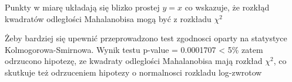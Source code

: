 \documentclass[a4paper,11pt]{article}
\def\\{\hfill\break}
\begin{document}
Punkty w miarę układają się blizko prostej $y = x$ co wskazuje, że rozkłąd kwadratów odległości Mahalanobisa mogą być z rozkładu $ \chi^2$

\\

Żeby bardziej się upewnić przeprowadzono test zgodnosci oparty na statystyce Kolmogorowa-Smirnowa. Wynik testu p-value = 0.0001707 < 5\% zatem odrzucono hipotezę, ze kwadraty odleglości Mahalanobisa mają rozkład $ \chi^2$, co skutkuje też odrzuceniem hipotezy o normalnosci rozkladu log-zwrotow
\end{document}
